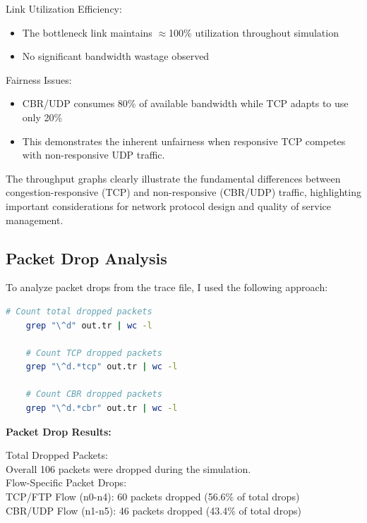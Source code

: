 \documentclass[12pt]{article}
\begin{document}
	\noindent
	Link Utilization Efficiency:
	\begin{itemize}
		\item The bottleneck link maintains $\approx$100\% utilization throughout simulation
		\item No significant bandwidth wastage observed
	\end{itemize}
	
	\noindent
	Fairness Issues:
	\begin{itemize}
		\item CBR/UDP consumes 80\% of available bandwidth while TCP adapts to use only 20\%
		\item This demonstrates the inherent unfairness when responsive TCP competes with non-responsive UDP traffic.
	\end{itemize}
	
	\noindent
	The throughput graphs clearly illustrate the fundamental differences between congestion-responsive (TCP) and non-responsive (CBR/UDP) traffic, highlighting important considerations for network protocol design and quality of service management.
	
	\subsection{Packet Drop Analysis}
	
	To analyze packet drops from the trace file, I used the following approach:
	
	\begin{lstlisting}[language=bash]
	# Count total dropped packets
	grep "\^d" out.tr | wc -l
	
	# Count TCP dropped packets
	grep "\^d.*tcp" out.tr | wc -l
	
	# Count CBR dropped packets  
	grep "\^d.*cbr" out.tr | wc -l
	\end{lstlisting}
	
	\noindent
	\textbf{Packet Drop Results:}
	
	\noindent
	Total Dropped Packets:	\\
	Overall 106 packets were dropped during the simulation.	\\
	
	\noindent
	Flow-Specific Packet Drops:	\\
	TCP/FTP Flow (n0-n4): 60 packets dropped (56.6\% of total drops)	\\
	CBR/UDP Flow (n1-n5): 46 packets dropped (43.4\% of total drops)	\\
	
\end{document}
